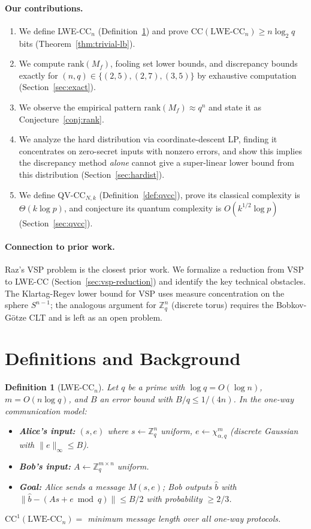 \documentclass[11pt]{article}
\newtheorem{definition}{Definition}
\theoremstyle{remark}
\newcommand{\Zq}{\mathbb{Z}_q}
\newcommand{\CC}{\mathrm{CC}}
\newcommand{\rank}{\mathrm{rank}}
\newcommand{\norm}[1]{\|#1\|}
\begin{document}
\paragraph{Our contributions.}
\begin{enumerate}
  \item We define LWE-CC$_n$ (Definition~\ref{def:lwecc}) and prove $\CC(\text{LWE-CC}_n)\geq n\log_2 q$ bits (Theorem~\ref{thm:trivial-lb}).
  \item We compute $\rank(M_f)$, fooling set lower bounds, and discrepancy bounds exactly for $(n,q)\in\{(2,5),(2,7),(3,5)\}$ by exhaustive computation (Section~\ref{sec:exact}).
  \item We observe the empirical pattern $\rank(M_f)\approx q^n$ and state it as Conjecture~\ref{conj:rank}.
  \item We analyze the hard distribution via coordinate-descent LP, finding it concentrates on zero-secret inputs with nonzero errors, and show this implies the discrepancy method \emph{alone} cannot give a super-linear lower bound from this distribution (Section~\ref{sec:hardist}).
  \item We define QV-CC$_{N,k}$ (Definition~\ref{def:qvcc}), prove its classical complexity is $\Theta(k\log p)$, and conjecture its quantum complexity is $O(k^{1/2}\log p)$ (Section~\ref{sec:qvcc}).
\end{enumerate}

\paragraph{Connection to prior work.}
Raz's VSP problem \cite{Raz99} is the closest prior work. We formalize a reduction from VSP to LWE-CC (Section~\ref{sec:vsp-reduction}) and identify the key technical obstacles. The Klartag-Regev lower bound \cite{KR11} for VSP uses measure concentration on the sphere $S^{n-1}$; the analogous argument for $\Zq^n$ (discrete torus) requires the Bobkov-G\"{o}tze CLT and is left as an open problem.

\section{Definitions and Background}

\begin{definition}[LWE-CC$_n$]\label{def:lwecc}
Let $q$ be a prime with $\log q = O(\log n)$, $m = O(n\log q)$, and $B$ an error bound with $B/q \leq 1/(4n)$. In the one-way communication model:
\begin{itemize}
  \item \textbf{Alice's input:} $(s,e)$ where $s\leftarrow\Zq^n$ uniform, $e\leftarrow\chi_{\alpha,q}^m$ (discrete Gaussian with $\norm{e}_\infty\leq B$).
  \item \textbf{Bob's input:} $A\leftarrow\Zq^{m\times n}$ uniform.
  \item \textbf{Goal:} Alice sends a message $M(s,e)$; Bob outputs $\hat{b}$ with $\norm{\hat{b}-(As+e\bmod q)}\leq B/2$ with probability $\geq 2/3$.
\end{itemize}
$\CC^1(\text{LWE-CC}_n) = $ minimum message length over all one-way protocols.
\end{definition}
\end{document}
